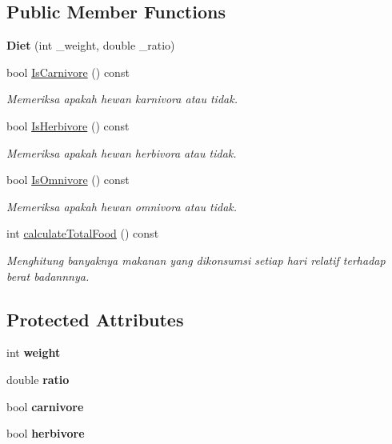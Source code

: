 \subsection*{Public Member Functions}
\begin{DoxyCompactItemize}
\item 
\hypertarget{classDiet_a28b20982e580421a276d9059073e6282}{{\bfseries Diet} (int \+\_\+weight, double \+\_\+ratio)}\label{classDiet_a28b20982e580421a276d9059073e6282}

\item 
bool \hyperlink{classDiet_af8d66ff89a8ffed6da619bd9851590ea}{Is\+Carnivore} () const 
\begin{DoxyCompactList}\small\item\em Memeriksa apakah hewan karnivora atau tidak. \end{DoxyCompactList}\item 
bool \hyperlink{classDiet_ac26831907b06d6407433d560c64e122a}{Is\+Herbivore} () const 
\begin{DoxyCompactList}\small\item\em Memeriksa apakah hewan herbivora atau tidak. \end{DoxyCompactList}\item 
bool \hyperlink{classDiet_a48e33eb64393a4fddc72e01388aec451}{Is\+Omnivore} () const 
\begin{DoxyCompactList}\small\item\em Memeriksa apakah hewan omnivora atau tidak. \end{DoxyCompactList}\item 
int \hyperlink{classDiet_aa680acdabd171e868e3c828b86a06ae4}{calculate\+Total\+Food} () const 
\begin{DoxyCompactList}\small\item\em Menghitung banyaknya makanan yang dikonsumsi setiap hari relatif terhadap berat badannnya. \end{DoxyCompactList}\end{DoxyCompactItemize}
\subsection*{Protected Attributes}
\begin{DoxyCompactItemize}
\item 
\hypertarget{classDiet_a75c841392204d37f8f0963f171d103d5}{int {\bfseries weight}}\label{classDiet_a75c841392204d37f8f0963f171d103d5}

\item 
\hypertarget{classDiet_a1eacec1714a4af74478fe2d2ad14d705}{double {\bfseries ratio}}\label{classDiet_a1eacec1714a4af74478fe2d2ad14d705}

\item 
\hypertarget{classDiet_a5a961cb7f0e58e79815934be79c77014}{bool {\bfseries carnivore}}\label{classDiet_a5a961cb7f0e58e79815934be79c77014}

\item 
\hypertarget{classDiet_a96cf53475c6082be1b5a68ea656c1bb4}{bool {\bfseries herbivore}}\label{classDiet_a96cf53475c6082be1b5a68ea656c1bb4}

\end{DoxyCompactItemize}


